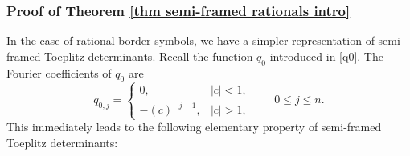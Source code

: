 \documentclass[10pt,a4paper]{amsart}
\numberwithin{equation}{section}
\begin{document}
\subsubsection{Proof of Theorem \ref{thm semi-framed rationals intro}}
		
In the case of rational border symbols, we have a simpler representation of semi-framed Toeplitz determinants. Recall the function $q_0$ introduced in \eqref{q0}.
		The Fourier coefficients of $q_0$ are
		\begin{equation}\label{q0 Fourier Coefficients}
			q_{0,j} = \begin{cases}
				0, & |c|<1, \\
				-(c)^{-j-1}, & |c|>1,
			\end{cases} \qquad 0 \leq j \leq n.
		\end{equation}
		This immediately leads to the following elementary property of semi-framed Toeplitz determinants:
		
\end{document}

